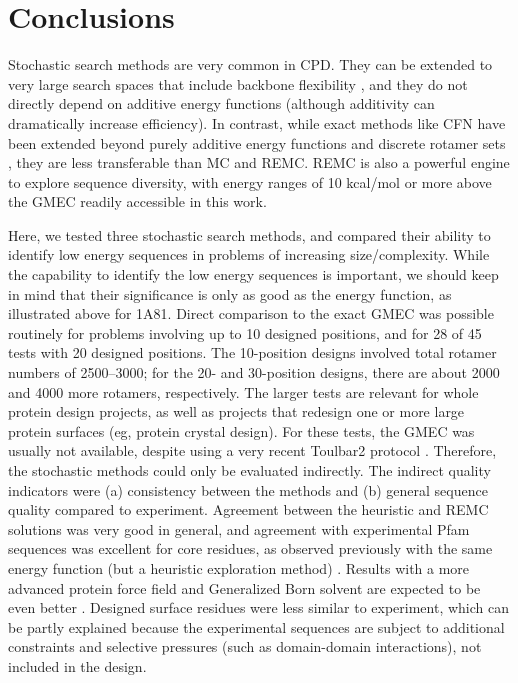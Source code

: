 \documentclass[a4paper,12pt]{article}
\begin{document}
\section{Conclusions}
Stochastic search methods are very common in CPD. They can be extended to very large search spaces that include
backbone flexibility \cite{Fung08,Mandell09,Huang11}, and they do not directly depend on additive energy functions
(although additivity can dramatically increase efficiency). In contrast, while exact methods like CFN have been extended
beyond purely additive energy functions \cite{Ng11,Lucore15} and discrete rotamer sets \cite{Georgiev08,Hallen15},
they are less transferable than MC and REMC. REMC is also a powerful engine to explore sequence diversity, with energy
ranges of 10 kcal/mol or more above the GMEC readily accessible in this work.

Here, we tested three stochastic search methods, and compared their ability to identify low energy sequences in problems
of increasing size/complexity. While the capability to identify the low energy sequences is important, we should keep in
mind that their significance is only as good as the energy function, as illustrated above for 1A81. Direct comparison to
the exact GMEC was possible routinely for problems involving up to 10 designed positions, and for 28 of 45 tests with 20
designed positions. The 10-position designs involved total rotamer numbers of 2500--3000; for the 20- and 30-position designs,
there are about 2000 and 4000 more rotamers, respectively. The larger tests are relevant for whole protein design projects,
as well as projects that redesign one or more large protein surfaces (eg, protein crystal design). For these tests, the GMEC
was usually not available, despite using a very recent Toulbar2 protocol \cite{Simoncini15}. Therefore, the stochastic
methods could only be evaluated indirectly. The indirect quality indicators were (a) consistency between the methods and
(b) general sequence quality compared to experiment. Agreement
between the heuristic and REMC solutions was very good in general, and agreement with experimental Pfam sequences was
excellent for core residues, as observed previously with the same energy function (but a heuristic exploration method)
\cite{Schmidt09,Schmidt10}. Results with a more advanced protein force field and Generalized Born solvent are expected to
be even better \cite{Polydorides11,Simonson15}. Designed surface residues were less similar to experiment, which can be
partly explained because the experimental sequences
are subject to additional constraints and selective pressures (such as domain-domain interactions), not included in the
design.  
\end{document}
